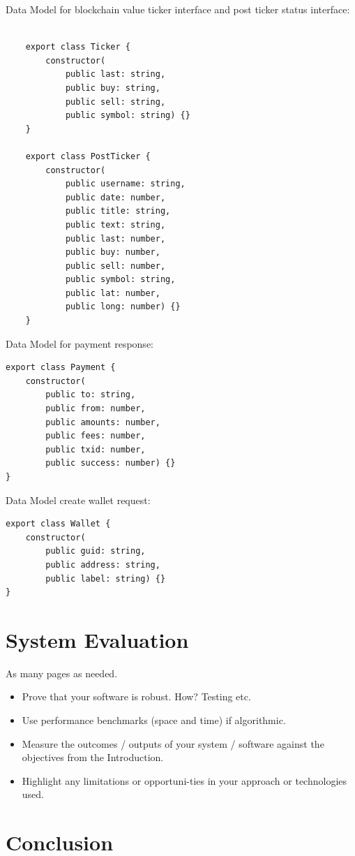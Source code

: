 Data Model for blockchain value ticker interface and post ticker status interface:
\begin{lstlisting}
       
    export class Ticker {
        constructor(
            public last: string,
            public buy: string,
            public sell: string,
            public symbol: string) {}
    }
    
    export class PostTicker {
        constructor(
            public username: string,
            public date: number,
            public title: string,
            public text: string,
            public last: number,
            public buy: number,
            public sell: number,
            public symbol: string,
            public lat: number,
            public long: number) {}
    }
\end{lstlisting}

Data Model for payment response:
\begin{lstlisting}
export class Payment {
    constructor(
        public to: string,
        public from: number,
        public amounts: number,
        public fees: number,
        public txid: number,
        public success: number) {}
}
\end{lstlisting}

Data Model create wallet request:
\begin{lstlisting}
export class Wallet {
    constructor(
        public guid: string,
        public address: string,
        public label: string) {}
}
\end{lstlisting}


\chapter{System Evaluation}
As many pages as needed.
\begin{itemize}
\item Prove that your software is robust. How? Testing etc. 
\item Use performance benchmarks (space and time) if algorithmic.
\item Measure the outcomes / outputs of your system / software against the objectives from the Introduction.
\item Highlight any limitations or opportuni-ties in your approach or technologies used.
\end{itemize}

\chapter{Conclusion}


